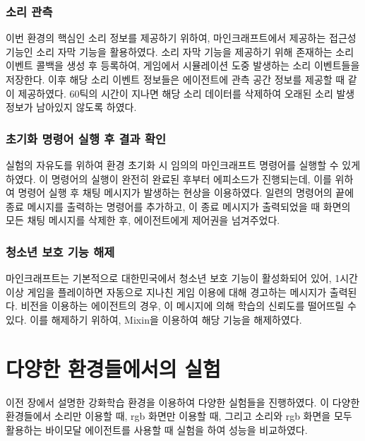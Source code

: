 \documentclass[oneside, under, ko]{snuthesis}
\begin{document}
\subsection{소리 관측}
이번 환경의 핵심인 소리 정보를 제공하기 위하여, 마인크래프트에서 제공하는 접근성 기능인 소리 자막 기능을 활용하였다. 소리 자막 기능을 제공하기 위해 존재하는 소리 이벤트 콜백을 생성 후 등록하여, 게임에서 시뮬레이션 도중 발생하는 소리 이벤트들을 저장한다. 이후 해당 소리 이벤트 정보들은 에이전트에 관측 공간 정보를 제공할 때 같이 제공하였다. 60틱의 시간이 지나면 해당 소리 데이터를 삭제하여 오래된 소리 발생 정보가 남아있지 않도록 하였다.

\subsection{초기화 명령어 실행 후 결과 확인}
실험의 자유도를 위하여 환경 초기화 시 임의의 마인크래프트 명령어를 실행할 수 있게 하였다. 이 명령어의 실행이 완전히 완료된 후부터 에피소드가 진행되는데, 이를 위하여 명령어 실행 후 채팅 메시지가 발생하는 현상을 이용하였다. 일련의 명령어의 끝에 종료 메시지를 출력하는 명령어를 추가하고, 이 종료 메시지가 출력되었을 때 화면의 모든 채팅 메시지를 삭제한 후, 에이전트에게 제어권을 넘겨주었다.

\subsection{청소년 보호 기능 해제}
마인크래프트는 기본적으로 대한민국에서 청소년 보호 기능이 활성화되어 있어, 1시간 이상 게임을 플레이하면 자동으로 지나친 게임 이용에 대해 경고하는 메시지가 출력된다. 비전을 이용하는 에이전트의 경우, 이 메시지에 의해 학습의 신뢰도를 떨어뜨릴 수 있다. 이를 해제하기 위하여, Mixin을 이용하여 해당 기능을 해제하였다.


\chapter{다양한 환경들에서의 실험}
이전 장에서 설명한 강화학습 환경을 이용하여 다양한 실험들을 진행하였다. 이 다양한 환경들에서 소리만 이용할 때, rgb 화면만 이용할 때, 그리고 소리와 rgb 화면을 모두 활용하는 바이모달 에이전트를 사용할 때 실험을 하여 성능을 비교하였다.
\end{document}
